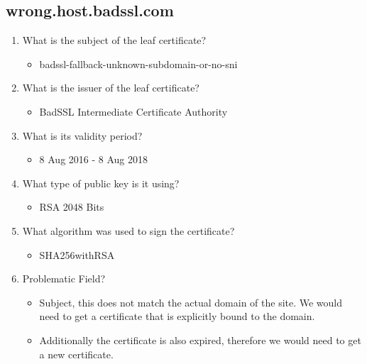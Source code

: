 \documentclass[11pt]{article}
\begin{document}
\subsection{wrong.host.badssl.com}
\label{sec:org982449d}
\begin{enumerate}
\item What is the subject of the leaf certificate?
\begin{itemize}
\item badssl-fallback-unknown-subdomain-or-no-sni
\end{itemize}
\item What is the issuer of the leaf certificate?
\begin{itemize}
\item BadSSL Intermediate Certificate Authority
\end{itemize}
\item What is its validity period?
\begin{itemize}
\item 8 Aug 2016 - 8 Aug 2018
\end{itemize}
\item What type of public key is it using?
\begin{itemize}
\item RSA 2048 Bits
\end{itemize}
\item What algorithm was used to sign the certificate?
\begin{itemize}
\item SHA256withRSA
\end{itemize}
\item Problematic Field?
\begin{itemize}
\item Subject, this does not match the actual domain of the site. We would need to get a certificate that is explicitly bound to the domain.
\item Additionally the certificate is also expired, therefore we would need to get a new certificate.
\end{itemize}
\end{enumerate}
\end{document}
